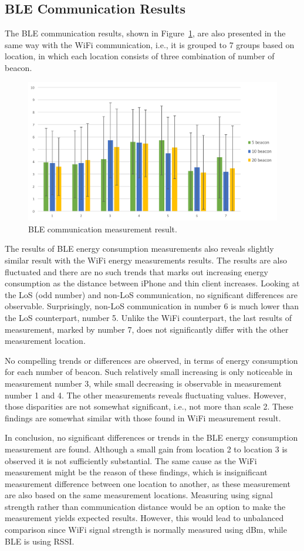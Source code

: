 \documentclass[journal]{vgtc}                %
\begin{document}
\subsection{BLE Communication Results} %
\label{sub:ble_communication_results}
The BLE communication results, shown in Figure~\ref{fig:ble-result}, are also presented in the same way with the WiFi communication, i.e., it is grouped to 7 groups based on location, in which each location consists of three combination of number of beacon.

\begin{figure}
  \centering
    \includegraphics[width=.5\textwidth]{ble}
  \caption{BLE communication measurement result.}
  \label{fig:ble-result}
\end{figure}

The results of BLE energy consumption measurements also reveals slightly similar result with the WiFi energy measurements results. The results are also fluctuated and there are no such trends that marks out increasing energy consumption as the distance between iPhone and thin client increases. Looking at the LoS (odd number) and non-LoS communication, no significant differences are observable. Surprisingly, non-LoS communication in number 6 is much lower than the LoS counterpart, number 5. Unlike the WiFi counterpart, the last results of measurement, marked by number 7, does not significantly differ with the other measurement location.

No compelling trends or differences are observed, in terms of energy consumption for each number of beacon. Such relatively small increasing is only noticeable in measurement number 3, while small decreasing is observable in measurement number 1 and 4. The other measurements reveals fluctuating values. However, those disparities are not somewhat significant, i.e., not more than scale 2. These findings are somewhat similar with those found in WiFi measurement result.

In conclusion, no significant differences or trends in the BLE energy consumption measurement are found. Although a small gain from location 2 to location 3 is observed it is not sufficiently substantial. The same cause as the WiFi measurement might be the reason of these findings, which is insignificant measurement difference between one location to another, as these measurement are also based on the same measurement locations. Measuring using signal strength rather than communication distance would be an option to make the measurement yields expected results. However, this would lead to unbalanced comparison since WiFi signal strength is normally measured using dBm, while BLE is using RSSI.
\end{document}
